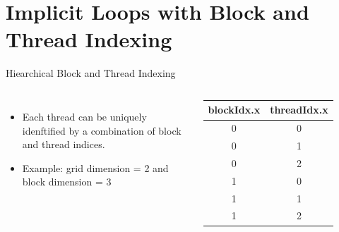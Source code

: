 \documentclass{beamer}
\begin{document}
    \section{Implicit Loops with Block and Thread Indexing}

    \begin{frame}{Hiearchical Block and Thread Indexing}
            \begin{columns}
                \begin{itemize}
                    \item Each thread can be uniquely idenftified by a combination of block and thread indices.
                    \item Example: grid dimension = 2 and block dimension = 3
                \end{itemize}
                \begin{table}[]
                    \begin{tabular}{|c||c|}
                        \hline
                        blockIdx.x & threadIdx.x \\
                        \hline
                        \hline
                        0          & 0           \\
                        0          & 1           \\
                        0          & 2           \\
                        \hline
                        1          & 0           \\
                        1          & 1           \\
                        1          & 2           \\
                        \hline
                    \end{tabular}
                \end{table}
            \end{columns}
        \end{frame}
\end{document}

